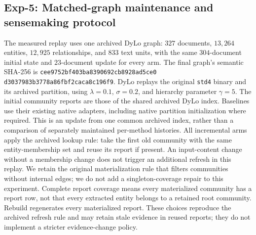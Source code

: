 \subsection{Exp-5: Matched-graph maintenance and sensemaking protocol}
\label{app:exp5-detail}

 The measured replay uses one archived
DyLo graph: $327$ documents, $13{,}264$ entities, $12{,}925$ relationships,
and $833$ text units, with the same $304$-document initial state and
$23$-document update for every arm. The final graph's semantic SHA-256 is
\texttt{cee9752bf403ba839}\allowbreak\texttt{0692cb8928ad5ce0}\allowbreak
\texttt{d3037983b3778a86}\allowbreak\texttt{fbf2caca8c196f9}.
DyLo replays the original \texttt{std4} binary and its archived partition,
using $\lambda=0.1$, $\sigma=0.2$, and hierarchy parameter $\gamma=5$.
The initial community reports are those of the shared archived DyLo index.
Baselines use their existing native adapters, including native partition
initialization where required. This is an update from one common archived
index, rather than a comparison of separately maintained per-method histories.
All incremental arms apply the archived lookup rule: take the first old
community with the same entity-membership set and reuse its report if present.
An input-content change without a membership
change does not trigger an additional refresh in this replay. We retain the
original materialization rule that filters communities without internal edges;
we do not add a singleton-coverage repair to this experiment. Complete report
coverage means every materialized community has a report row, not that every
extracted entity belongs to a retained root community. Rebuild regenerates
every materialized report. These choices reproduce the archived refresh rule
and may retain stale evidence in reused reports; they do not implement a
stricter evidence-change policy.

